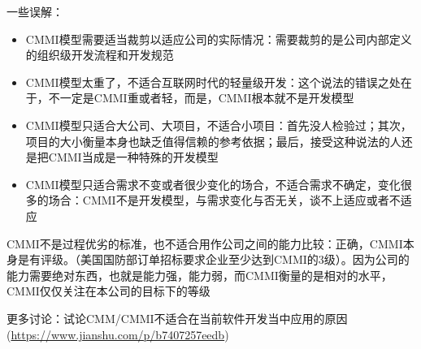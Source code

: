 一些误解：
\begin{itemize}
    \item CMMI模型需要适当裁剪以适应公司的实际情况：需要裁剪的是公司内部定义的组织级开发流程和开发规范
    \item CMMI模型太重了，不适合互联网时代的轻量级开发：这个说法的错误之处在于，不一定是CMMI重或者轻，而是，CMMI根本就不是开发模型
    \item CMMI模型只适合大公司、大项目，不适合小项目：首先没人检验过；其次，项目的大小衡量本身也缺乏值得信赖的参考依据；最后，接受这种说法的人还是把CMMI当成是一种特殊的开发模型
    \item CMMI模型只适合需求不变或者很少变化的场合，不适合需求不确定，变化很多的场合：CMMI不是开发模型，与需求变化与否无关，谈不上适应或者不适应
\end{itemize}

{\kaishu CMMI不是过程优劣的标准，也不适合用作公司之间的能力比较：}正确，CMMI本身是有评级。（美国国防部订单招标要求企业至少达到CMMI的3级）。因为公司的能力需要绝对东西，也就是能力强，能力弱，而CMMI衡量的是相对的水平，CMMI仅仅关注在本公司的目标下的等级

更多讨论：试论CMM/CMMI不适合在当前软件开发当中应用的原因(\url{https://www.jianshu.com/p/b7407257eedb})


